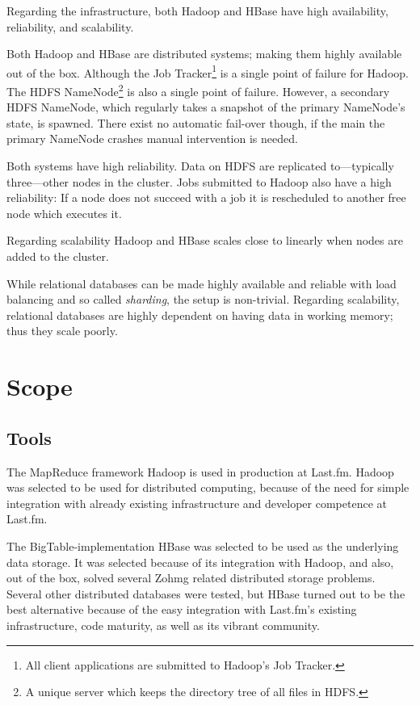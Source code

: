 Regarding the infrastructure, both Hadoop and HBase have high availability,
reliability, and scalability.

Both Hadoop and HBase are distributed systems; making them highly available out
of the box. Although the Job Tracker\footnote{All client applications are
submitted to Hadoop's Job Tracker.} is a single point of failure for Hadoop.
The HDFS NameNode\footnote{A unique server which keeps the directory tree of all
files in HDFS.} is also a single point of failure. However, a secondary HDFS
NameNode, which regularly takes a snapshot of the primary NameNode's state, is
spawned. There exist no automatic fail-over though, if the main the primary
NameNode crashes manual intervention is needed.

Both systems have high reliability. Data on HDFS are replicated to---typically
three---other nodes in the cluster. Jobs submitted to Hadoop also have a high
reliability: If a node does not succeed with a job it is rescheduled to another
free node which executes it.

Regarding scalability Hadoop and HBase scales close to linearly when nodes are
added to the cluster.

While relational databases can be made highly available and reliable with load
balancing and so called \textit{sharding}, the setup is non-trivial. Regarding
scalability, relational databases are highly dependent on having data in working
memory; thus they scale poorly.


\section{Scope}

\subsection*{Tools}

The MapReduce framework Hadoop is used in production at Last.fm. Hadoop was
selected to be used for distributed computing, because of the need for simple
integration with already existing infrastructure and developer competence at
Last.fm.

The BigTable-implementation HBase was selected to be used as the underlying data
storage. It was selected because of its integration with Hadoop, and also, out of
the box, solved several Zohmg related distributed storage problems. Several
other distributed databases were tested, but HBase turned out to be the best
alternative because of the easy integration with Last.fm's existing
infrastructure, code maturity, as well as its vibrant community.


